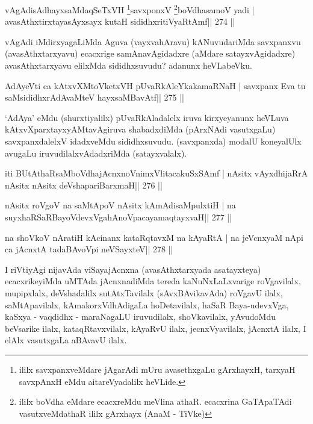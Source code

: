 \begin{shl}
vAgAdisAdhayxsaMdaqSeTxVH \footnote{ililx savxpanxveMdare jAgarAdi mUru avasethxgaLu  gArxhayxH, tarxyaH savxpAnxH eMdu aitareVyadalilx heVLide.}savxponxV \footnote{ililx boVdha eMdare ecacxreMdu meVlina athaR. ecacxrina GaTApaTAdi vasutxveMdathaR ililx gArxhayx (AnaM - TiVke)}boVdhasamoV yadi |
avasAthxtirxtayasAyxsayx kutaH sididhxritiVyaRtAmf\hfill || 274 ||
\end{shl}

\begin{artha}
vAgAdi iMdirxyagaLiMda Aguva (vayxvahAravu) kANuvudariMda savxpanxvu (avasAthxtarxyavu) ecacxrige samAnavAgidadxre (aMdare satayxvAgidadxre) avasAthxtarxyavu elilxMda sididhxsuvudu? adanunx heVLabeVku.
\end{artha}

\begin{shl}
AdAyeVti ca kAtxvXMtoVketxVH pUvaRkAleYkakamaRNaH |
savxpanx Eva tu saMsididhxrAdAvaMteV hayxsaMBavAtf\hfill || 275 ||
\end{shl}

\begin{artha}
`AdAya' eMdu (shurxtiyalilx) pUvaRkAladalelx iruva kirxyeyanunx heVLuva kAtxvXparxtayxyAMtavAgiruva shabadxdiMda (pArxNAdi vasutxgaLu) savxpanxdalelxV idadxveMdu sididhxsuvudu. (savxpanxda) modalU koneyalUlx avugaLu iruvudilalxvAdadxriMda (satayxvalalx).
\end{artha}


\begin{shl}
iti BUtAthaRsaMboVdhajAcnxnoVnimxVlitacakuSxSAmf |
nAsitx vAyxdhijaRrA nAsitx nAsitx deVshapariBarxmaH\hfill || 276 ||
\end{shl}

\begin{shl}
nAsitx roVgoV na saMtApoV nAsitx kAmAdisaMpulxtiH |
na suyxhaRSaRBayoVdevxVgahAnoVpacayamaqtayxvaH\hfill || 277 ||
\end{shl}

\begin{shl}
na shoVkoV nAratiH kAcinanx kataRqtavxM na kAyaRtA |
na jeVcnxyaM nApi ca jAcnxtA tadaBAvoV\s pi neVSayxteV\hfill || 278 ||
\end{shl}

\begin{artha}
I riVtiyAgi nijavAda viSayajAcnxna (avasAthxtarxyada asatayxteya) 
ecacxrikeyiMda uMTAda jAcnxnadiMda tereda kaNuNxLaLxvarige roVgavilalx, mupipxlalx, deVshadalilx sutAtxTavilalx (sAvxBAvikavAda) roVgavU ilalx, saMtApavilalx, kAmakorxVdhAdigaLa hoDetavilalx, haSaR Baya-udevxVga, kaSxya - vaqdidhx - maraNagaLU iruvudilalx, shoVkavilalx, yAvudoMdu beVsarike ilalx, kataqRtavxvilalx, kAyaRvU ilalx, jecnxVyavilalx, jAcnxtA ilalx, I elAlx vasutxgaLa aBAvavU ilalx.
\end{artha}


